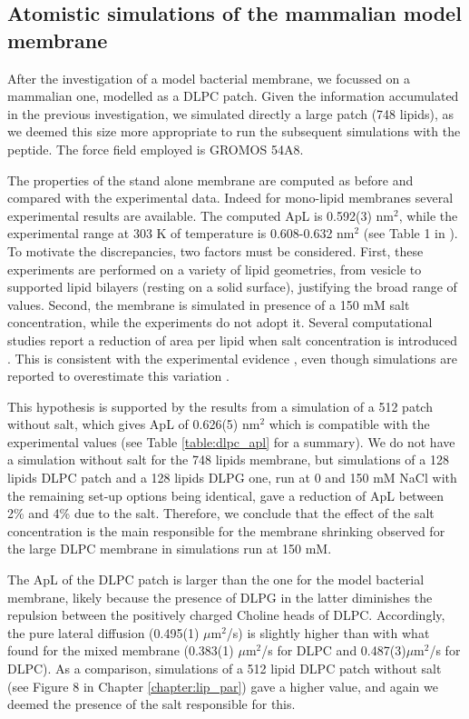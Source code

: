 \subsection{Atomistic simulations of the mammalian model membrane} \label{sec:lip_atom_mamm}

After the investigation of a model bacterial membrane, we focussed on a mammalian one, modelled as a DLPC patch. Given the information accumulated in the previous investigation, we simulated directly a large patch (748 lipids), as we deemed this size more appropriate to run the subsequent simulations with the peptide. The force field employed is GROMOS 54A8.

The properties of the stand alone membrane are computed as before and compared with the experimental data. Indeed for mono-lipid membranes several experimental results are available. The computed ApL is 0.592(3) nm$^2$, while the experimental range at 303 K of temperature is 0.608-0.632 nm$^2$ (see Table 1 in \citet{Poger2016}). To motivate the discrepancies, two factors must be considered. First, these experiments are performed on a variety of lipid geometries, from vesicle to supported lipid bilayers (resting on a solid surface), justifying the broad range of values. Second, the membrane is simulated in presence of a 150 mM salt concentration, while the experiments do not adopt it. Several computational studies report a reduction of area per lipid when salt concentration is introduced \citep{Bockmann2003,Jarerattanachat2013,Reif2017}. This is consistent with the experimental evidence \citep{Pabst2007}, even though simulations are reported to overestimate this variation \citep{Reif2017}.

This hypothesis is supported by the results from a simulation of a 512 patch without salt, which gives ApL of 0.626(5) nm$^2$ which is compatible with the experimental values (see Table \ref{table:dlpc_apl} for a summary). We do not have a simulation without salt for the 748 lipids membrane, but simulations of a 128 lipids DLPC patch and a 128 lipids DLPG one, run at 0 and 150 mM NaCl with the remaining set-up options being identical, gave a reduction of ApL between 2\% and 4\% due to the salt.
%
Therefore, we conclude that the effect of the salt concentration is the main responsible for the membrane shrinking observed for the large DLPC membrane in simulations run at 150 mM.

The ApL of the DLPC patch is larger than the one for the model bacterial membrane, likely because the presence of DLPG in the latter diminishes the repulsion between the positively charged Choline heads of DLPC. Accordingly, the pure lateral diffusion (0.495(1) $\mu$m$^2$/s) is slightly higher than with what found for the mixed membrane (0.383(1) $\mu$m$^2$/s for DLPC and 0.487(3)$\mu$m$^2$/s for DLPC). As a comparison, simulations of a 512 lipid DLPC patch without salt (see Figure 8 in Chapter \ref{chapter:lip_par}) gave a higher value, and again we deemed the presence of the salt responsible for this.

